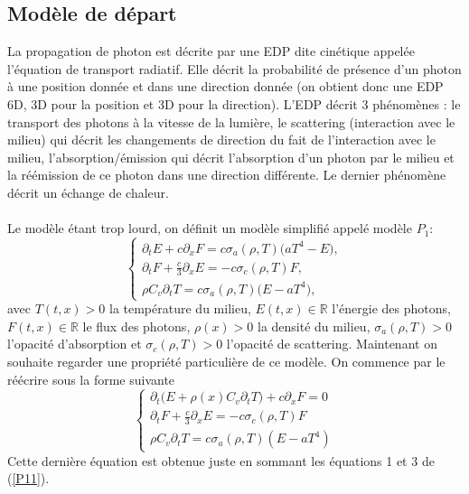 \documentclass[11pt]{article}
\theoremstyle{definition}
\begin{document}
\subsection{Modèle de départ}
La propagation de photon est décrite par une EDP dite cinétique appelée l'équation de transport radiatif. Elle décrit la probabilité de présence d'un photon à une position donnée et dans une direction donnée (on obtient donc une EDP 6D, 3D pour la position et 3D pour la direction). L'EDP décrit 3 phénomènes : le transport des photons à la vitesse de la lumière, le scattering (interaction avec le milieu) qui décrit les changements de direction du fait de l'interaction avec le milieu, l'absorption/émission qui décrit l'absorption d'un photon par le milieu et la réémission de ce photon dans une direction différente.  Le dernier phénomène décrit un échange de chaleur. \\\\
Le modèle étant trop lourd, on définit un modèle simplifié appelé modèle $P_1$:
\begin{equation}\label{P11}
\left\{\begin{array}{l}
\displaystyle \partial_t E + c\partial_x F = c\sigma_a(\rho,T) \big(aT^4-E\big), \\
\displaystyle\partial_t F + \frac{c}{3}\partial_x E = - c\sigma_c(\rho,T)F,\\
\displaystyle\rho C_v \partial_t T = c\sigma_a(\rho,T)\big(E-aT^4\big),
\end{array}\right.
\end{equation}
avec $T(t,x) > 0$ la température du milieu, $E(t,x) \in \mathbb{R}$ l'énergie des photons, $F(t,x) \in \mathbb{R}$ le flux des photons, $\rho(x) > 0$ la densité du milieu, $\sigma_a(\rho, T) > 0$ l'opacité d'absorption et $\sigma_c(\rho,T) > 0$ l'opacité de scattering. Maintenant on souhaite regarder une propriété particulière de ce modèle. On commence par le réécrire sous la forme suivante
\begin{equation}\label{P12}
\left\{\begin{array}{l}
\displaystyle \partial_t \big(E + \rho(x)C_v \partial_t T\big) + c\partial_x F = 0 \\
\displaystyle\partial_t F + \frac{c}{3}\partial_x E = - c\sigma_c(\rho,T)F\\
\displaystyle\rho C_v \partial_t T = c\sigma_a(\rho,T)(E-aT^4)
\end{array}\right.
\end{equation}
Cette dernière équation est obtenue juste en sommant les équations 1 et 3 de (\ref{P11}).\\
\end{document}
